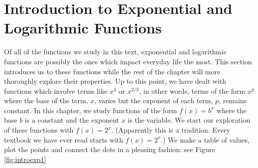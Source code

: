 \section{Introduction to Exponential and Logarithmic Functions}

\label{IntroExpLogs}

Of all of the functions we study in this text, exponential and logarithmic functions are possibly the ones which impact everyday life the most.  This section introduces us to these functions while the rest of the chapter will more thoroughly explore their properties.  Up to this point, we have dealt with functions which involve terms like $x^2$ or $x^{2/3}$, in other words, terms of the form  $x^{p}$ where the base of the term, $x$, varies but the exponent of each term, $p$, remains constant.  In this chapter, we study functions of the form $f(x) = b^{x}$ where the base $b$ is a constant and the exponent $x$ is the variable.  We start our exploration of these functions with $f(x) = 2^{x}$. (Apparently this is a tradition.  Every textbook we have ever read starts with $f(x) = 2^{x}$.) We make a table of values, plot the points and connect the dots in a pleasing fashion: see Figure \ref{fig:introexp1}



